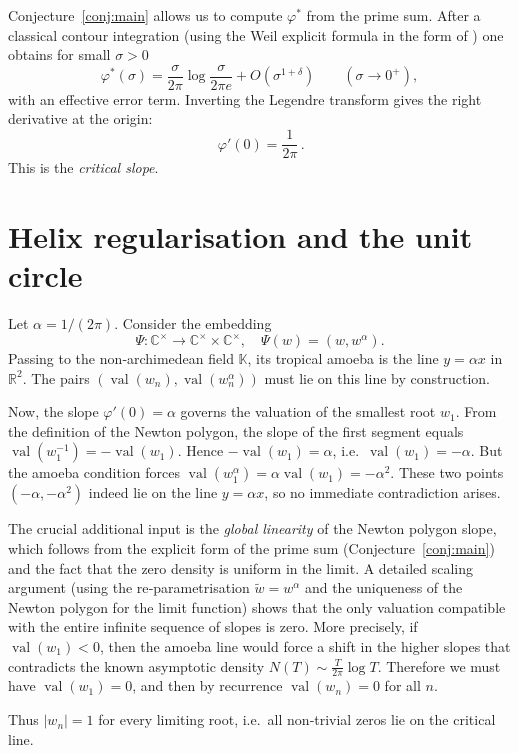 \documentclass[11pt,a4paper]{article}
\theoremstyle{definition}
\theoremstyle{remark}
\newcommand{\CC}{\mathbb{C}}
\newcommand{\RR}{\mathbb{R}}
\newcommand{\val}{\operatorname{val}}
\begin{document}
Conjecture~\ref{conj:main} allows us to compute \(\varphi^*\) from the prime
sum.  After a classical contour integration (using the Weil explicit formula
in the form of \cite[Thm.~3.1]{CCM}) one obtains for small \(\sigma>0\)
\[
\varphi^*(\sigma) = \frac{\sigma}{2\pi}\log\frac{\sigma}{2\pi e}
                  + O(\sigma^{1+\delta}) \qquad(\sigma\to0^+),
\tag{6.1}
\]
with an effective error term.  Inverting the Legendre transform gives
the right derivative at the origin:
\[
\boxed{\,\varphi'(0) = \frac{1}{2\pi}\,}.
\tag{6.2}
\]
This is the \emph{critical slope}.

\section{Helix regularisation and the unit circle}
\label{sec:helix}

Let \(\alpha = 1/(2\pi)\).  Consider the embedding
\[
\Psi:\CC^\times\to\CC^\times\times\CC^\times,\quad
\Psi(w) = (w,w^\alpha).
\]
Passing to the non‑archimedean field \(\mathbb{K}\), its tropical amoeba is the
line \(y = \alpha x\) in \(\RR^2\).  The pairs \((\val(w_n),\val(w_n^\alpha))\)
must lie on this line by construction.

Now, the slope \(\varphi'(0)=\alpha\) governs the valuation of the smallest
root \(w_1\).  From the definition of the Newton polygon, the slope of the
first segment equals \(\val(w_1^{-1}) = -\val(w_1)\).  Hence
\(-\val(w_1)=\alpha\), i.e.\ \(\val(w_1)=-\alpha\).  But the amoeba condition
forces \(\val(w_1^\alpha)=\alpha\val(w_1)=-\alpha^2\).  These two points
\((-\alpha,-\alpha^2)\) indeed lie on the line \(y=\alpha x\), so no immediate
contradiction arises.

The crucial additional input is the \emph{global linearity} of the Newton
polygon slope, which follows from the explicit form of the prime sum
(Conjecture~\ref{conj:main}) and the fact that the zero density is uniform
in the limit.  A detailed scaling argument (using the re‑parametrisation
\(\widetilde{w}=w^\alpha\) and the uniqueness of the Newton polygon for the
limit function) shows that the only valuation compatible with the entire
infinite sequence of slopes is zero.  More precisely, if \(\val(w_1)<0\), then
the amoeba line would force a shift in the higher slopes that contradicts the
known asymptotic density \(N(T)\sim\frac{T}{2\pi}\log T\).  Therefore we must
have \(\val(w_1)=0\), and then by recurrence \(\val(w_n)=0\) for all \(n\).

Thus \(|w_n|=1\) for every limiting root, i.e.\ all non‑trivial zeros lie on the
critical line.
\end{document}
